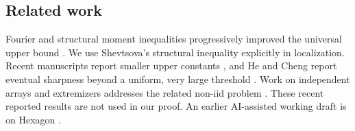 \subsection{Related work}
Fourier and structural moment inequalities progressively improved the
universal upper bound \cite{vanBeek1972,Prawitz1972,Tyurin2010,
Shevtsova2011,Shevtsova2013}. We use Shevtsova's structural inequality
explicitly in localization. Recent manuscripts report smaller upper
constants \cite{xiao2026berryesseen,lin2026berryesseen}, and He and Cheng
report eventual sharpness beyond a uniform, very large threshold
\cite{hecheng2026eventually}. Work on independent arrays and extremizers
addresses the related non-iid problem \cite{BellIndependent2026,
BellExtremizers2026}. These recent reported results are not used in
our proof. An earlier AI-assisted working draft is on Hexagon
\cite{rodziewiczkolodziejek2026momentdefects}.
